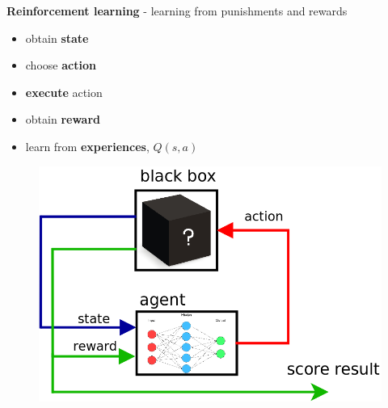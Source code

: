 \documentclass[xcolor=dvipsnames]{beamer}
\begin{document}
\begin{frame}{\bf Reinforcement learning}
- learning from punishments and rewards

\begin{itemize}
  \item obtain {\bf state}
  \item choose {\bf action}
  \item {\bf execute} action
  \item obtain {\bf reward}
  \item learn from {\bf experiences}, $Q(s, a)$
\end{itemize}

  \begin{figure}
    \includegraphics[scale=0.3]{./diagrams/rl_mechanism.png}
  \end{figure}

\end{frame}
\end{document}
